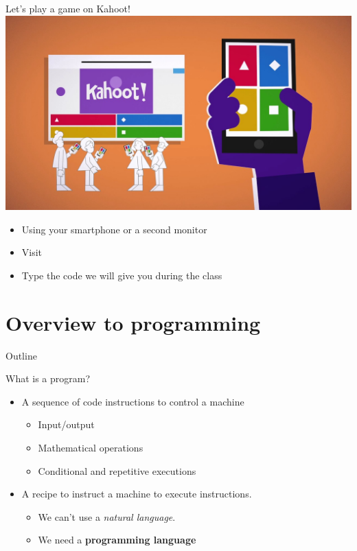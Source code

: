 \documentclass{beamer}%
\begin{document}
\begin{frame}{Let's play a game on Kahoot!}
	\centering
\includegraphics[width=0.8\linewidth]{figures/kahoot.jpg}
	\begin{itemize}	
	\item Using your smartphone or a second monitor
	\item Visit	
	\item Type the code we will give you during the class
	\end{itemize}
\end{frame}

\section{Overview to programming}
\begin{frame}{Outline}
	\tableofcontents[currentsection]
\end{frame}


\begin{frame}{What is a program?}
	\begin{itemize}
		\item A sequence of code instructions to control a machine
		\begin{itemize}
			\item Input/output
			\item Mathematical operations
			\item Conditional and repetitive executions
		\end{itemize}
		\item A recipe to instruct a machine to execute instructions. 
		\begin{itemize}
			\item We can't use a \emph{natural language}. 
			\item We need a \textbf{programming language}
		\end{itemize}
	\end{itemize}
\end{frame}
\end{document}
